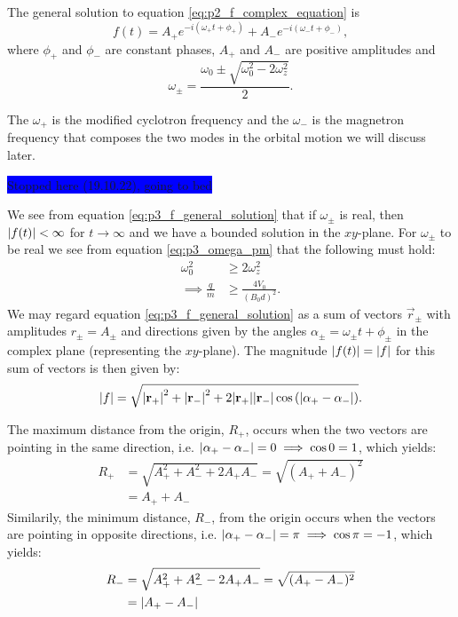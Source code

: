 The general solution to equation \eqref{eq:p2_f_complex_equation} is 
\begin{equation}
    f(t) = A_+ e^{-i(\omega_+ t + \phi_+)} + A_- e^{-i(\omega_- t + \phi_-)}, \label{eq:p3_f_general_solution}
\end{equation}
where $\phi_+$ and $\phi_-$ are constant phases, $A_+$ and $A_-$ are positive amplitudes and 
\begin{equation}
    \omega_\pm = \frac{\omega_0 \pm \sqrt{\omega_0^2 - 2\omega_z^2}}{2}. \label{eq:p3_omega_pm}
\end{equation}

The $\omega_+$ is the modified cyclotron frequency and the $\omega_-$ is the magnetron frequency that composes the two modes in the orbital motion we will discuss later.

\colorbox{blue}{Stopped here (19.10.22), going to bed}


We see from equation  \eqref{eq:p3_f_general_solution} that if $\omega_\pm$ is real, then $\abs{f(t)} < \infty$ for $t\to\infty$ and we have a bounded solution in the $xy$-plane. For $\omega_\pm$ to be real we see from equation \eqref{eq:p3_omega_pm} that the following must hold:
\begin{align}
    \omega_0^2 &\geq 2\omega_z^2  \\
    \implies \frac{q}{m} &\geq \frac{4V_0}{(B_0d)^2}.
\end{align} 
We may regard equation \eqref{eq:p3_f_general_solution} as a sum of vectors $\vec{r}_\pm$ with amplitudes $r_\pm=A_\pm$ and directions given by the angles $\alpha_\pm = \omega_\pm t + \phi_\pm$ in the complex plane (representing the $xy$-plane). The magnitude $\abs{f(t)} = \abs{f}$ for this sum of vectors is then given by:
\begin{align}
    \abs{f} = \sqrt{\abs{\mathbf{r}_+}^2 + \abs{\mathbf{r}_-}^2 + 2\abs{\mathbf{r}_+}\abs{\mathbf{r_-}}\cos{(\abs{\alpha_+-\alpha_-})}}.
\end{align}






The maximum distance from the origin, $R_+$, occurs when the two vectors are pointing in the same direction, i.e. $\abs{\alpha_+-\alpha_-} = 0 \implies \cos0=1$, which yields:
\begin{align}
    R_+ &= \sqrt{A_+^2 + A_-^2 + 2A_+A_-} = \sqrt{(A_+ + A_-)^2} \nonumber \\
    &= A_+ + A_-
\end{align}
Similarily, the minimum distance, $R_-$, from the origin occurs when the vectors are pointing in opposite directions, i.e. $\abs{\alpha_+-\alpha_-} = \pi \implies \cos\pi=-1$, which yields:
\begin{align}
    R_- &= \sqrt{A_+^2 + A_-^2 - 2A_+A_-} = \sqrt{(A_+ - A_-)^2} \nonumber \\
    &= \abs{A_+ - A_-}
\end{align}




